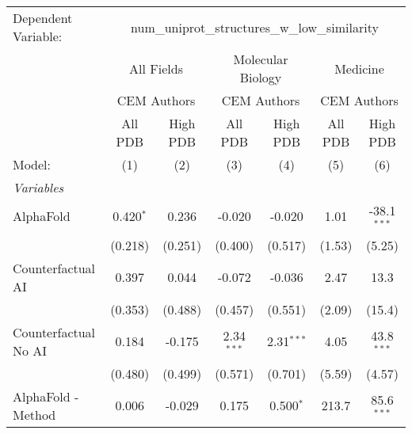 \begingroup
\centering
\begin{tabular}{lcccccc}
   \tabularnewline \midrule \midrule
   Dependent Variable: & \multicolumn{6}{c}{num\_uniprot\_structures\_w\_low\_similarity}\\
 & \multicolumn{2}{c}{All Fields} & \multicolumn{2}{c}{Molecular Biology} & \multicolumn{2}{c}{Medicine} \\
\cmidrule(lr){2-3} \cmidrule(lr){4-5} \cmidrule(lr){6-7}
 & \multicolumn{2}{c}{CEM Authors} & \multicolumn{2}{c}{CEM Authors} & \multicolumn{2}{c}{CEM Authors} \\
\cmidrule(lr){2-3} \cmidrule(lr){4-5} \cmidrule(lr){6-7}
 & \multicolumn{1}{c}{All PDB} & \multicolumn{1}{c}{High PDB} & \multicolumn{1}{c}{All PDB} & \multicolumn{1}{c}{High PDB} & \multicolumn{1}{c}{All PDB} & \multicolumn{1}{c}{High PDB} \\
\cmidrule(lr){2-2} \cmidrule(lr){3-3} \cmidrule(lr){4-4} \cmidrule(lr){5-5} \cmidrule(lr){6-6} \cmidrule(lr){7-7}
   Model:                                                     & (1)          & (2)         & (3)           & (4)           & (5)        & (6)\\  
   \midrule
   \emph{Variables}\\
   AlphaFold                                                  & 0.420$^{*}$  & 0.236       & -0.020        & -0.020        & 1.01       & -38.1$^{***}$\\   
                                                              & (0.218)      & (0.251)     & (0.400)       & (0.517)       & (1.53)     & (5.25)\\   
   Counterfactual AI                                          & 0.397        & 0.044       & -0.072        & -0.036        & 2.47       & 13.3\\   
                                                              & (0.353)      & (0.488)     & (0.457)       & (0.551)       & (2.09)     & (15.4)\\   
   Counterfactual No AI                                       & 0.184        & -0.175      & 2.34$^{***}$  & 2.31$^{***}$  & 4.05       & 43.8$^{***}$\\   
                                                              & (0.480)      & (0.499)     & (0.571)       & (0.701)       & (5.59)     & (4.57)\\   
   AlphaFold - Method                                         & 0.006        & -0.029      & 0.175         & 0.500$^{*}$   & 213.7      & 85.6$^{***}$\\   

\end{tabular}
